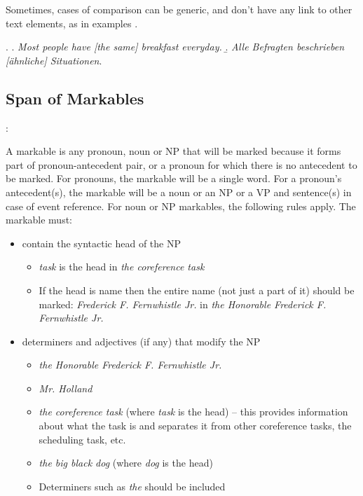 \documentclass[a4paper]{article}
\begin{document}
{{Sometimes, cases of comparison can be generic, and don't have any link to other text elements, as in examples \Next[a-b].

\ex.
\a. {\sl Most people have [the same] breakfast everyday.}
\b. {\sl Alle Befragten beschrieben [ähnliche] Situationen}.


\subsection{Span of Markables}

\cite{GrishinaStedeGuide,GuillouEtAlGuide}:

A markable is any pronoun, noun or NP that will be marked because it forms part of pronoun-antecedent pair, or a pronoun for which there is no antecedent to be marked. For pronouns, the markable will be a single word. For a pronoun's antecedent(s), the markable will be a noun or an NP or a VP and sentence(s) in case of event reference. For noun or NP markables, the following rules apply. The markable must:

\begin{itemize}
\item contain the syntactic head of the NP
\begin{itemize}
\item {\sl task} is the head in {\sl the coreference task}
\item If the head is name then the entire name (not just a part of it) should be marked: {\sl Frederick F. Fernwhistle Jr.} in {\sl the Honorable Frederick F. Fernwhistle Jr.}
\end{itemize}

\item  determiners and adjectives (if any) that modify the NP
\begin{itemize}
\item {\sl the Honorable Frederick F. Fernwhistle Jr.}
\item {\sl Mr. Holland}
\item {\sl the coreference task} (where {\sl task} is the head) -- this provides information about what the task is and separates it from other coreference tasks, the scheduling task, etc.
\item {\sl the big black dog} (where {\sl dog} is the head)
\item Determiners such as {\sl the} should be included
\end{itemize}


\end{itemize}}}
\end{document}

